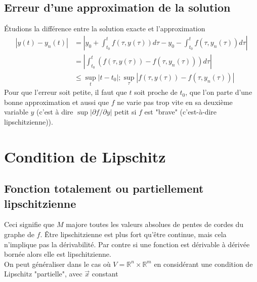 	\subsection{Erreur d'une approximation de la solution}
	Étudions la différence entre la solution exacte et l'approximation
	\begin{equation}
	\begin{array}{ll}
	|y(t) - y_n(t)| &= |y_0 + \int_{t_0}^t f(\tau,y(\tau))d\tau - y_0 - \int_{t_0}^t 
	f(\tau, y_n(\tau))d\tau|\\
	 &= |\int_{t_0}^t (f(\tau,y(\tau)) - f(\tau,y_n(\tau)))d\tau|\\
	 &\leq \sup_t |t-t_0| ; \sup_\tau |f(\tau,y(\tau)) - f(\tau,y_n(\tau))|
	\end{array}
	\end{equation}
	Pour que l'erreur soit petite, il faut que $t$ soit proche de $t_0$, que l'on 
	parte d'une bonne approximation et aussi que $f$ ne varie pas trop vite en sa 
	deuxième variable $y$ (c'est à dire $\sup |\partial f/\partial y|$ petit si 
	$f$ est "brave" (c'est-à-dire lipschitzienne)).
	
\setcounter{section}{4}
\section{Condition de Lipschitz}
	\subsection{Fonction totalement ou partiellement lipschitzienne}
	Ceci signifie que $M$ majore toutes les valeurs absolues de pentes de cordes 
	du graphe de $f$. Être lipschitzienne est plus fort qu'être continue, mais 
	cela n'implique pas la dérivabilité. Par contre si une fonction est dérivable 
	à dérivée bornée alors elle est lipschitzienne.\\
	
	On peut généraliser dans le cas où $V = \mathbb{R}^n\times\mathbb{R}^m$ en 
	considérant une condition de Lipschitz "partielle", avec $\vec{x}$ constant 

	
